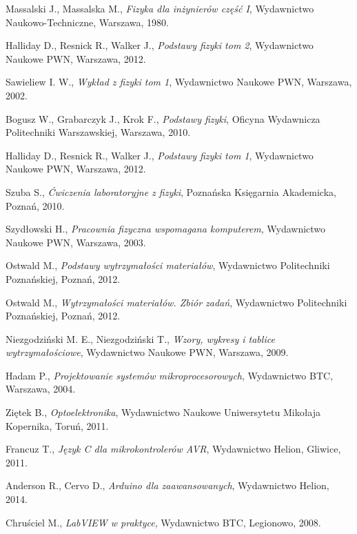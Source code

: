 \documentclass[12pt]{article} %
\numberwithin{equation}{subsection}
\numberwithin{figure}{section}
\numberwithin{table}{section}
\begin{document}
\begin{thebibliography}{99}

		Massalski J., Massalska M., \emph{Fizyka dla inżynierów część I}, Wydawnictwo Naukowo-Techniczne, Warszawa, 1980.
	
		Halliday D., Resnick R., Walker J., \emph{Podstawy fizyki tom 2}, Wydawnictwo Naukowe PWN, Warszawa, 2012.

		Sawieliew I. W., \emph{Wykład z fizyki tom 1}, Wydawnictwo Naukowe PWN, Warszawa, 2002.
	
		Bogusz W., Grabarczyk J., Krok F., \emph{Podstawy fizyki}, Oficyna Wydawnicza Politechniki Warszawskiej, Warszawa, 2010.
	
		Halliday D., Resnick R., Walker J., \emph{Podstawy fizyki tom 1}, Wydawnictwo Naukowe PWN, Warszawa, 2012.
	
		Szuba S., \emph{Ćwiczenia laboratoryjne z fizyki}, Poznańska Księgarnia Akademicka, Poznań, 2010.
	
		Szydłowski H., \emph{Pracownia fizyczna wspomagana komputerem}, Wydawnictwo Naukowe PWN, Warszawa, 2003.
		
		Ostwald M., \emph{Podstawy wytrzymałości materiałów}, Wydawnictwo Politechniki Poznańskiej, Poznań, 2012.
	
		Ostwald M., \emph{Wytrzymałości materiałów. Zbiór zadań}, Wydawnictwo Politechniki Poznańskiej, Poznań, 2012.
		
		Niezgodziński M. E., Niezgodziński T., \emph{Wzory, wykresy i tablice wytrzymałościowe}, Wydawnictwo Naukowe PWN, Warszawa, 2009.
	
		Hadam P., \emph{Projektowanie systemów mikroprocesorowych}, Wydawnictwo BTC, Warszawa, 2004.
	
		Ziętek B., \emph{Optoelektronika}, Wydawnictwo Naukowe Uniwersytetu Mikołaja Kopernika, Toruń, 2011.
	
		Francuz T., \emph{Język C dla mikrokontrolerów AVR}, Wydawnictwo Helion, Gliwice, 2011.
	
		Anderson R., Cervo D., \emph{Arduino dla zaawansowanych}, Wydawnictwo Helion, 2014.
	
		Chruściel M., \emph{LabVIEW w praktyce}, Wydawnictwo BTC, Legionowo, 2008.
	

\end{thebibliography}
\end{document}
